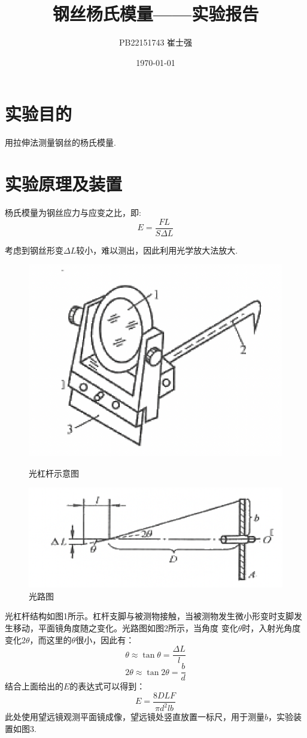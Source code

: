 \documentclass[UTF8]{ctexart}
\title{钢丝杨氏模量——实验报告}
\author{PB22151743 崔士强}
\date{\today}
\begin{document}
\maketitle

\section{实验目的}
用拉伸法测量钢丝的杨氏模量.
\section{实验原理及装置}
杨氏模量为钢丝应力与应变之比，即:
\[E=\frac{FL}{S\Delta L}\]

考虑到钢丝形变$\Delta L$较小，难以测出，因此利用光学放大法放大.
\begin{figure}[h]
    \centering
    \includegraphics[scale=0.3]{1.png}
    \caption{光杠杆示意图}
    \includegraphics[scale=0.3]{2.png}
    \caption{光路图}
\end{figure}

光杠杆结构如图1所示。杠杆支脚与被测物接触，当被测物发生微小形变时支脚发生移动，平面镜角度随之变化。光路图如图2所示，当角度
变化$\theta$时，入射光角度变化$2\theta$，而这里的$\theta$很小，因此有：
\[\theta \approx \tan \theta =\frac{\Delta L}{l}\]
\[2 \theta \approx \tan 2\theta =\frac{b}{d}\]
结合上面给出的$E$的表达式可以得到：
\[E=\frac{8DLF}{\pi d^2lb}\]
此处使用望远镜观测平面镜成像，望远镜处竖直放置一标尺，用于测量$b$，实验装置如图3.
\end{document}
